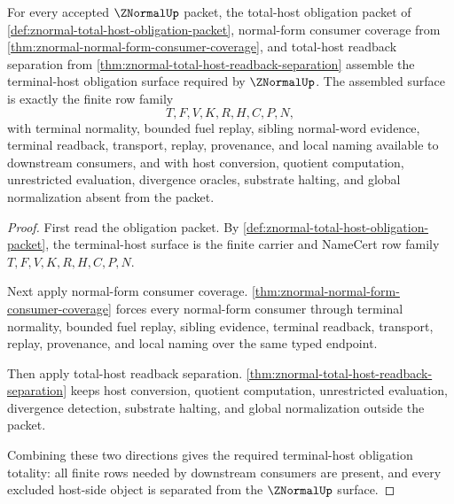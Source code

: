 \begin{theorem}
\label{thm:znormal-terminal-host-obligation-totality}
For every accepted $\ZNormalUp$ packet, the total-host obligation packet of \autoref{def:znormal-total-host-obligation-packet}, normal-form consumer coverage from \autoref{thm:znormal-normal-form-consumer-coverage}, and total-host readback separation from \autoref{thm:znormal-total-host-readback-separation} assemble the terminal-host obligation surface required by $\ZNormalUp$. The assembled surface is exactly the finite row family
$$
T,F,V,K,R,H,C,P,N,
$$
with terminal normality, bounded fuel replay, sibling normal-word evidence, terminal readback, transport, replay, provenance, and local naming available to downstream consumers, and with host conversion, quotient computation, unrestricted evaluation, divergence oracles, substrate halting, and global normalization absent from the packet.
\end{theorem}
\begin{proof}
First read the obligation packet. By \autoref{def:znormal-total-host-obligation-packet}, the terminal-host surface is the finite carrier and NameCert row family $T,F,V,K,R,H,C,P,N$.

Next apply normal-form consumer coverage. \autoref{thm:znormal-normal-form-consumer-coverage} forces every normal-form consumer through terminal normality, bounded fuel replay, sibling evidence, terminal readback, transport, replay, provenance, and local naming over the same typed endpoint.

Then apply total-host readback separation. \autoref{thm:znormal-total-host-readback-separation} keeps host conversion, quotient computation, unrestricted evaluation, divergence detection, substrate halting, and global normalization outside the packet.

Combining these two directions gives the required terminal-host obligation totality: all finite rows needed by downstream consumers are present, and every excluded host-side object is separated from the $\ZNormalUp$ surface.
\end{proof}
